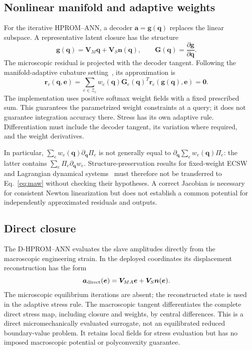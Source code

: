 \documentclass[10pt,a4paper]{article}
\newcommand{\ee}{\bm e}
\newcommand{\qq}{\bm q}
\begin{document}
\subsection{Nonlinear manifold and adaptive weights}
For the iterative HPROM--ANN, a decoder $\bm a=\bm g(\qq)$ replaces the linear subspace. A representative latent closure has the structure
\begin{equation}
 \bm g(\qq)=\bm V_M\qq+\bm V_S\bm n(\qq),\qquad
 \bm G(\qq)=\frac{\partial\bm g}{\partial\qq}.
\end{equation}
The microscopic residual is projected with the decoder tangent. Following the manifold-adaptive cubature setting~\cite{hernandez2026}, its approximation is
\begin{equation}
 \bm r_r(\qq,\ee)=\sum_{e\in\mathcal Z_r} w_e(\qq)\bm G_e(\qq)^T
 \bm r_e(\bm g(\qq),\ee)=\bm0.
 \label{eq:maw}
\end{equation}
The implementation uses positive softmax weight fields with a fixed prescribed sum. This guarantees the parametrized weight constraints at a query; it does not guarantee integration accuracy there. Stress has its own adaptive rule. Differentiation must include the decoder tangent, its variation where required, and the weight derivatives.

In particular, $\sum_e w_e(\qq)\partial_{\qq}\Pi_e$ is not generally equal to $\partial_{\qq}\sum_e w_e(\qq)\Pi_e$: the latter contains $\sum_e\Pi_e\partial_{\qq}w_e$. Structure-preservation results for fixed-weight ECSW and Lagrangian dynamical systems~\cite{farhat2015} must therefore not be transferred to Eq.~\eqref{eq:maw} without checking their hypotheses. A correct Jacobian is necessary for consistent Newton linearization but does not establish a common potential for independently approximated residuals and outputs.

\subsection{Direct closure}
The D-HPROM--ANN evaluates the slave amplitudes directly from the macroscopic engineering strain. In the deployed coordinates its displacement reconstruction has the form
\begin{equation}
 \bm a_{\rm direct}(\ee)=\bm V_{MA}\ee+\bm V_S\bm n(\ee).
\end{equation}
The microscopic equilibrium iterations are absent; the reconstructed state is used in the adaptive stress rule. The macroscopic tangent differentiates the complete direct stress map, including closure and weights, by central differences. This is a direct micromechanically evaluated surrogate, not an equilibrated reduced boundary-value problem. It retains local fields for stress evaluation but has no imposed macroscopic potential or polyconvexity guarantee.
\end{document}
